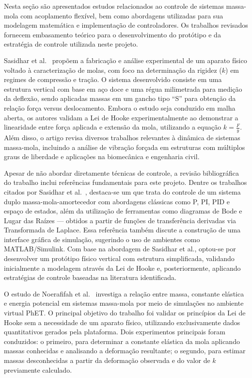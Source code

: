 \documentclass[9pt,a4paper,twocolumn,twoside]{tau-class/tau}
\begin{document}
    Nesta seção são apresentados estudos relacionados ao controle de sistemas massa-mola com acoplamento flexível, bem como abordagens utilizadas para sua modelagem matemática e implementação de controladores. Os trabalhos revisados fornecem embasamento teórico para o desenvolvimento do protótipo e da estratégia de controle utilizada neste projeto.

    Sasidhar et al.~\cite{sasidhar2025} propõem a fabricação e análise experimental de um aparato físico voltado à caracterização de molas, com foco na determinação da rigidez ($k$) em regimes de compressão e tração. O sistema desenvolvido consiste em uma estrutura vertical com base em aço doce e uma régua milimetrada para medição da deflexão, sendo aplicadas massas em um gancho tipo “S” para obtenção da relação força versus deslocamento. Embora o estudo seja conduzido em malha aberta, os autores validam a Lei de Hooke experimentalmente ao demonstrar a linearidade entre força aplicada e extensão da mola, utilizando a equação $k = \frac{F}{y}$. Além disso, o artigo revisa diversos trabalhos relevantes à dinâmica de sistemas massa-mola, incluindo a análise de vibração forçada em estruturas com múltiplos graus de liberdade e aplicações na biomecânica e engenharia civil.

    Apesar de não abordar diretamente técnicas de controle, a revisão bibliográfica do trabalho inclui referências fundamentais para este projeto. Dentre os trabalhos citados por Sasidhar et al.~\cite{sasidhar2025}, destaca-se um que trata do controle de um sistema duplo massa-mola-amortecedor com abordagens clássicas como P, PI, PID e espaço de estados, além da utilização de ferramentas como diagramas de Bode e Lugar das Raízes — obtidos a partir de funções de transferência derivadas via Transformada de Laplace. Essa referência também discute a construção de uma interface gráfica de simulação, sugerindo o uso de ambientes como MATLAB/Simulink. Com base na abordagem de Sasidhar et al., optou-se por desenvolver um protótipo físico vertical com estrutura simplificada, validando inicialmente a modelagem através da Lei de Hooke e, posteriormente, aplicando estratégias de controle baseadas na literatura identificada.

    O estudo de Noerafifah et al.~\cite{noerafifah2025} investiga a relação entre massa, constante elástica e energia potencial em sistemas massa-mola por meio de simulações no ambiente virtual PhET. O principal objetivo do trabalho foi validar os princípios da Lei de Hooke sem a necessidade de um aparato físico, utilizando exclusivamente dados quantitativos gerados pela plataforma. Dois experimentos principais foram conduzidos: o primeiro, para determinar a constante elástica da mola aplicando massas conhecidas e analisando a deformação resultante; o segundo, para estimar massas desconhecidas a partir da deformação observada e do valor de $k$ previamente calculado.
\end{document}
